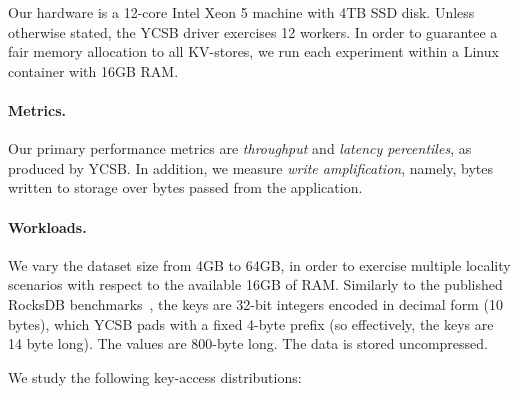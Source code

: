 Our hardware is a 12-core Intel Xeon 5 machine with 4TB SSD disk. Unless otherwise stated, the YCSB driver  
exercises 12 workers. In order to guarantee a fair memory allocation to all KV-stores, 
we run each experiment within a Linux container with 16GB RAM. 

\paragraph{Metrics.} Our primary performance metrics are \emph{throughput} 
and \emph{latency percentiles}, as produced by YCSB. 
In addition, we measure \emph{write amplification}, namely, bytes written to storage over bytes passed from the application. 

\paragraph{Workloads.} 
We vary the dataset size from 4GB to 64GB, in order to exercise multiple locality 
scenarios with respect to the available 16GB of RAM. Similarly to the published RocksDB benchmarks~\cite{RocksDBPerf}, 
the keys are 32-bit integers encoded in decimal form (10 bytes), which YCSB pads with a fixed 4-byte prefix (so effectively, 
the keys are 14 byte long). The values are 800-byte long. The data is stored uncompressed. 

We study the following key-access distributions:  

